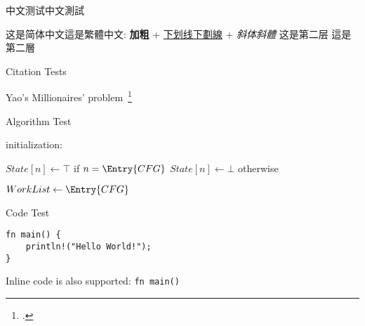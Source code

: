 \begin{frame}{中文测试中文測試}
	\begin{outline}
		\1 这是简体中文這是繁體中文: \textbf{加粗} + \underline{下划线下劃線} + \textit{斜体斜體}
			\2 这是第二层
			\2 這是第二層
	\end{outline}
\end{frame}

\begin{frame}{Citation Tests}
	\begin{outline}
		\1 Yao's Millionaires' problem~\footcite{10.5555/1382436.1382751}
	\end{outline}
\end{frame}

\begin{frame}{Algorithm Test}
    \IncMargin{1em}
    \begin{algorithm}[H]
      \DontPrintSemicolon
      \SetVlineSkip{0pt}
      \scriptsize
      initialization: \parbox[t]{\linewidth}{
        $State[n] \leftarrow \top$ if $n=\Entry{CFG}$\;
        $State[n] \leftarrow \bot$ otherwise\;}
    
      $WorkList \leftarrow \Entry{CFG}$\;
      \SetAlCapHSkip{.5em}
      \caption{Basic algorithm for Abstract Interpretation}
    \end{algorithm}
\end{frame}

\begin{frame}[fragile]{Code Test}
    \begin{verbatim}
fn main() {
    println!("Hello World!");
}
    \end{verbatim}
	\begin{outline}
		\1 Inline code is also supported: \texttt{fn main() { }}
	\end{outline}
\end{frame}

